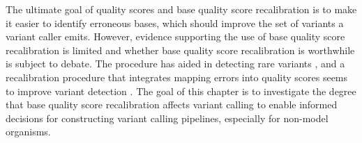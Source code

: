 \documentclass{report}
\begin{document}
\begin{outline}
\begin{outline}
	\item The ultimate goal of quality scores and base quality score recalibration is to make it easier to identify erroneous bases, which should improve the set of variants a variant caller emits. However, evidence supporting the use of base quality score recalibration is limited and whether base quality score recalibration is worthwhile is subject to debate. The procedure has aided in detecting rare variants \parencite{ni_improvement_2016}, and a recalibration procedure that integrates mapping errors into quality scores seems to improve variant detection \parencite{li_improving_2011}. The goal of this chapter is to investigate the degree that base quality score recalibration affects variant calling to enable informed decisions for constructing variant calling pipelines, especially for non-model organisms.
	
	\end{outline}

\end{outline}
\end{document}
